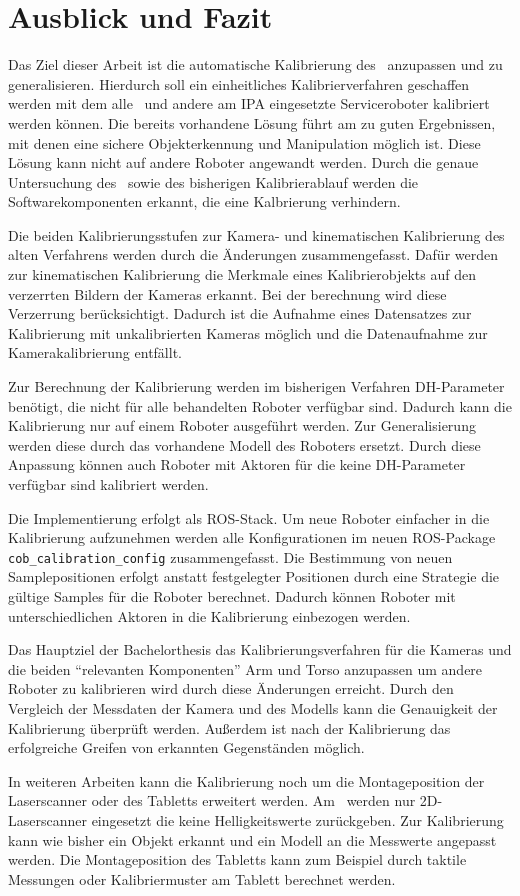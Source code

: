 \chapter{Ausblick und Fazit}

Das Ziel dieser Arbeit ist die automatische Kalibrierung des \cob\ anzupassen 
und zu generalisieren. Hierdurch soll ein einheitliches Kalibrierverfahren 
geschaffen werden mit dem alle \cob\ und andere am \ac{IPA} eingesetzte 
Serviceroboter kalibriert werden können. Die bereits vorhandene Lösung führt am
\cob{} zu guten Ergebnissen, mit denen eine sichere Objekterkennung und
Manipulation möglich ist. Diese Lösung kann nicht auf andere Roboter angewandt
werden. Durch die genaue Untersuchung des \cob\ sowie des bisherigen
Kalibrierablauf werden die Softwarekomponenten erkannt, die eine Kalbrierung 
verhindern. 

Die beiden Kalibrierungsstufen zur Kamera- und kinematischen Kalibrierung  des
alten Verfahrens werden durch die Änderungen zusammengefasst. Dafür werden zur 
kinematischen Kalibrierung die Merkmale eines Kalibrierobjekts auf den
verzerrten Bildern der Kameras erkannt. Bei der berechnung wird diese
Verzerrung berücksichtigt. Dadurch ist die Aufnahme eines Datensatzes zur
Kalibrierung mit unkalibrierten Kameras möglich und die Datenaufnahme zur
Kamerakalibrierung entfällt. 

Zur Berechnung der Kalibrierung werden im bisherigen Verfahren \ac{DH-Parameter}
benötigt, die nicht für alle behandelten Roboter verfügbar sind. Dadurch 
kann die Kalibrierung nur auf einem Roboter ausgeführt werden. Zur Generalisierung
werden diese durch das vorhandene Modell des Roboters ersetzt. Durch diese 
Anpassung können auch Roboter mit Aktoren für die keine \ac{DH-Parameter} 
verfügbar sind kalibriert werden.

Die Implementierung erfolgt als \ac{ROS}-Stack. Um neue Roboter einfacher in 
die Kalibrierung aufzunehmen werden alle Konfigurationen im neuen
\ac{ROS}-Package \texttt{cob\_calibration\_config} zusammengefasst. Die
Bestimmung von neuen Samplepositionen erfolgt anstatt festgelegter Positionen 
durch eine Strategie die gültige Samples für die Roboter berechnet. Dadurch 
können Roboter mit unterschiedlichen Aktoren in die Kalibrierung einbezogen 
werden. 

Das Hauptziel der Bachelorthesis das Kalibrierungsverfahren für die Kameras und
die beiden ``relevanten Komponenten'' Arm und Torso anzupassen um andere Roboter
zu kalibrieren wird durch diese Änderungen erreicht. Durch den Vergleich der
Messdaten der Kamera und des Modells kann die Genauigkeit der Kalibrierung 
überprüft werden. Außerdem ist nach der Kalibrierung das erfolgreiche Greifen 
von erkannten Gegenständen möglich. 

In weiteren Arbeiten kann die Kalibrierung noch um die Montageposition der
Laserscanner oder des Tabletts erweitert werden. Am \cob\ werden nur 2D-Laserscanner
eingesetzt die keine Helligkeitswerte zurückgeben. Zur Kalibrierung kann wie 
bisher ein Objekt erkannt und ein Modell an die Messwerte angepasst werden.
Die Montageposition des Tabletts kann zum Beispiel durch taktile Messungen oder
Kalibriermuster am Tablett berechnet werden.

